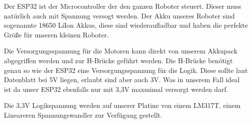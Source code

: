 Der ESP32 ist der Microcontroller der den ganzen Roboter steuert. Dieser muss natürlich auch mit Spannung versogt werden.
Der Akku unseres Roboter sind sogenannte 18650 LiIon Akkus, diese sind wiederaufladbar und haben die perfekte Größe 
für unseren kleinen Roboter.

Die Versorgungsspannung für die Motoren kann direkt von unserem Akkupack abgegriffen werden und zur H-Brücke geführt werden.
Die H-Brücke benötigt genau so wie der ESP32 eine Versorgungsspannung für die Logik.
Diese sollte laut Datenblatt bei 5V liegen, erlaubt sind aber auch 3V. Was in unserem Fall ideal ist da unser ESP32
ebenfalls nur mit 3,3V maxmimal versorgt werden darf.

Die 3,3V Logikspannung werden auf unserer Platine von einem LM317T, einem Lineareren Spannungswandler zur Verfügung gestellt.

